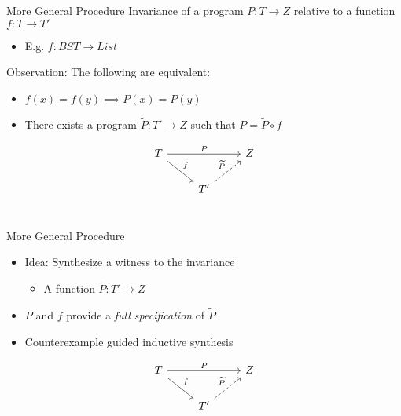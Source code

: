 \documentclass[usenames,dvipsnames]{beamer}
\begin{document}
\begin{frame}[fragile]{More General Procedure}
  Invariance of a program $P : T\to Z$
  relative to a function $f : T \to T'$
  \begin{itemize}
    \item E.g. $f : BST \to List$
  \end{itemize}
  \vfill
  Observation:
  The following are equivalent:
  \begin{itemize}
    \item $f(x) = f(y) \implies P(x) = P(y)$
    \item There exists a program $\widetilde{P} : T'\to Z$
      such that $P = \widetilde{P} \circ f$
  \end{itemize}

  \[
    \begin{tikzcd}
      T \arrow{rr}{P} \arrow{rd}{f} &   & Z \\
      & T' \arrow[dashed]{ru}{\widetilde{P}} &   \\
    \end{tikzcd}
  \]
\end{frame}

\begin{frame}[fragile]{More General Procedure}
  \begin{itemize}
    \item Idea: Synthesize a witness to the invariance
    \begin{itemize}
      \item A function $\widetilde{P} : T' \to Z$
    \end{itemize}
    \item $P$ and $f$ provide a \emph{full specification} of $\widetilde{P}$
    \item Counterexample guided inductive synthesis
  \end{itemize}

  \[
    \begin{tikzcd}
      T \arrow{rr}{P} \arrow{rd}{f} &   & Z \\
      & T' \arrow[dashed]{ru}{\widetilde{P}} &   \\
    \end{tikzcd}
  \]
\end{frame}
\end{document}
